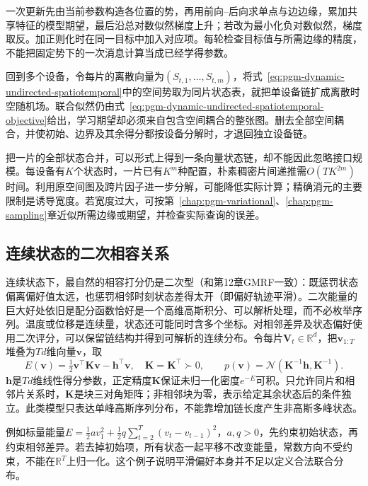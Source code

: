 一次更新先由当前参数构造各位置的势，再用前向--后向求单点与边边缘，累加共享特征的模型期望，最后沿总对数似然梯度上升；若改为最小化负对数似然，梯度取反。加正则化时在同一目标中加入对应项。每轮检查目标值与所需边缘的精度，不能把固定势下的一次消息计算当成已经学得参数。

回到多个设备，令每片的离散向量为$(S_{t,1},\ldots,S_{t,m})$，将式~\eqref{eq:pgm-dynamic-undirected-spatiotemporal}中的空间势取为同片状态表，就把单设备链扩成离散时空随机场。联合似然仍由式~\eqref{eq:pgm-dynamic-undirected-spatiotemporal-objective}给出，学习期望却必须来自包含空间耦合的整张图。删去全部空间耦合，并使初始、边界及其余得分都按设备分解时，才退回独立设备链。

把一片的全部状态合并，可以形式上得到一条向量状态链，却不能因此忽略接口规模。每设备有$K$个状态时，一片已有$K^m$种配置，朴素稠密片间递推需$O(TK^{2m})$时间。利用原空间图及跨片因子进一步分解，可能降低实际计算；精确消元的主要限制是诱导宽度。若宽度过大，可按第~\ref{chap:pgm-variational}、\ref{chap:pgm-sampling}章近似所需边缘或期望，并检查实际查询的误差。

\subsection{连续状态的二次相容关系}
\label{sec:pgm-dynamic-undirected-gaussian-chain}

连续状态下，最自然的相容打分仍是二次型（和第12章GMRF一致）：既惩罚状态偏离偏好值太远，也惩罚相邻时刻状态差得太开（即偏好轨迹平滑）。二次能量的巨大好处依旧是配分函数恰好是一个高维高斯积分、可以解析处理，而不必枚举序列。温度或位移是连续量，状态还可能同时含多个坐标。对相邻差异及状态偏好使用二次评分，可以保留链结构并得到可解析的连续分布。令每片$\bm V_t\in\mathbb R^d$，把$\bm v_{1:T}$堆叠为$Td$维向量$\bm v$，取
\begin{equation}
  E(\bm v)=\tfrac12\bm v^\top\bm K\bm v-\bm h^\top\bm v,
  \quad \bm K=\bm K^\top\succ0,
  \qquad
  p(\bm v)=\mathcal N(\bm K^{-1}\bm h,\bm K^{-1}).
  \label{eq:pgm-dynamic-undirected-gaussian}
\end{equation}
$\bm h$是$Td$维线性得分参数，正定精度$\bm K$保证未归一化密度$e^{-E}$可积。只允许同片和相邻片关系时，$\bm K$是块三对角矩阵；非相邻块为零，表示给定其余状态后的条件独立。此类模型只表达单峰高斯序列分布，不能靠增加链长度产生非高斯多峰状态。

例如标量能量$E=\tfrac12av_1^2+\tfrac12q\sum_{t=2}^T(v_t-v_{t-1})^2$，$a,q>0$，先约束初始状态，再约束相邻差异。若去掉初始项，所有状态一起平移不改变能量，常数方向不受约束，不能在$\mathbb R^T$上归一化。这个例子说明平滑偏好本身并不足以定义合法联合分布。

